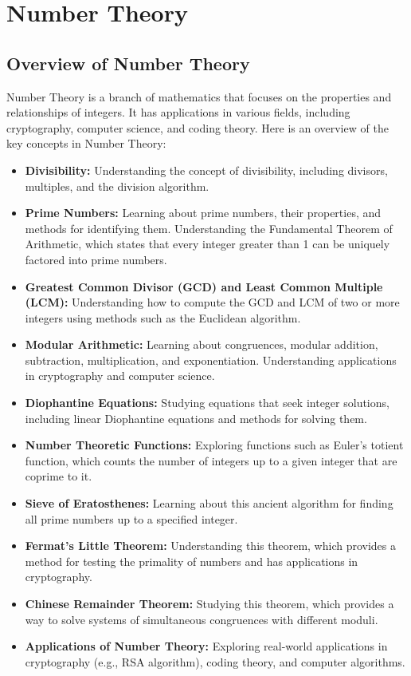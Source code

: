 \documentclass[openany]{book}
\begin{document}
\section{Number Theory}
\subsection{Overview of Number Theory}
Number Theory is a branch of mathematics that focuses on the properties and relationships of integers. It has applications in various fields, including cryptography, computer science, and coding theory. Here is an overview of the key concepts in Number Theory:
\begin{itemize}
    \item \textbf{Divisibility:} Understanding the concept of divisibility, including divisors, multiples, and the division algorithm.
    \item \textbf{Prime Numbers:} Learning about prime numbers, their properties, and methods for identifying them. Understanding the Fundamental Theorem of Arithmetic, which states that every integer greater than 1 can be uniquely factored into prime numbers.
    \item \textbf{Greatest Common Divisor (GCD) and Least Common Multiple (LCM):} Understanding how to compute the GCD and LCM of two or more integers using methods such as the Euclidean algorithm.
    \item \textbf{Modular Arithmetic:} Learning about congruences, modular addition, subtraction, multiplication, and exponentiation. Understanding applications in cryptography and computer science.
    \item \textbf{Diophantine Equations:} Studying equations that seek integer solutions, including linear Diophantine equations and methods for solving them.
    \item \textbf{Number Theoretic Functions:} Exploring functions such as Euler's totient function, which counts the number of integers up to a given integer that are coprime to it.
    \item \textbf{Sieve of Eratosthenes:} Learning about this ancient algorithm for finding all prime numbers up to a specified integer.
    \item \textbf{Fermat's Little Theorem:} Understanding this theorem, which provides a method for testing the primality of numbers and has applications in cryptography.
    \item \textbf{Chinese Remainder Theorem:} Studying this theorem, which provides a way to solve systems of simultaneous congruences with different moduli.
    \item \textbf{Applications of Number Theory:} Exploring real-world applications in cryptography (e.g., RSA algorithm), coding theory, and computer algorithms.
\end{itemize}
\end{document}
